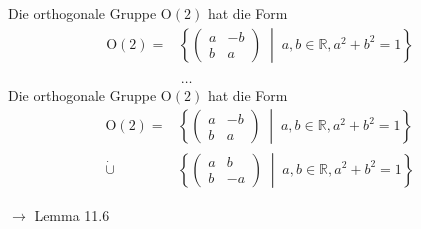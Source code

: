 \documentclass[11pt]{article}
\renewcommand{\cite}[1]{\par\bigskip\hfill{\color{gray}\tiny\(\to\) #1}}
\newcommand{\RR}{\mathbb{R}}
\let\olddots\dots
\renewcommand{\dots}{\,\olddots\,}
\newenvironment{field}{}{\newpage}
\newif\ifnote
\newenvironment{note}{\notetrue}{\notefalse}
\begin{document}
\begin{note}
    \begin{field}
        Die orthogonale Gruppe \(\text{O}(2)\) hat die Form
        \begin{align*}
            \text{O}(2) = &\left\{\left(\begin{smallmatrix}
                                  a & -b\\ b & a
                                \end{smallmatrix}\right) \;\middle\vert\; a,b\in \RR, a^2+b^2=1\right\}\\
            \phantom{\dot\cup} &\dots
        \end{align*}
    \end{field}
    \begin{field}
        Die orthogonale Gruppe \(\text{O}(2)\) hat die Form
        \begin{align*}
            \text{O}(2) = &\left\{\left(\begin{smallmatrix}
                                  a & -b\\ b & a
                                \end{smallmatrix}\right) \;\middle\vert\; a,b\in \RR, a^2+b^2=1\right\}\\
            \dot\cup &\left\{\left(\begin{smallmatrix}
                              a & b\\ b & -a
                          \end{smallmatrix}\right) \;\middle\vert\; a,b\in \RR, a^2+b^2=1\right\}
        \end{align*}
        \cite{Lemma 11.6}
    \end{field}
\end{note}
\end{document}
